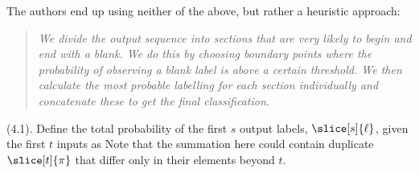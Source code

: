 \documentclass[11pt]{article}
\begin{document}
The authors end up using neither of the above, but rather a heuristic approach:
\vspace{-0.5em}
\begin{quote}
	{\footnotesize\itshape
		We divide the output sequence into sections that are very likely to begin and end with a blank. We do this by choosing boundary points where the probability of observing a blank label is above a certain threshold. We then calculate the most probable labelling for each section individually and concatenate these to get the final classification.}
\end{quote}

\myspace
\p {} (4.1). Define the total probability of the first $s$ output labels, $\slice[s]{\ell}$, given the first $t$ inputs as 
Note that the summation here could contain duplicate $\slice[t]{\pi}$ that differ only in their elements beyond $t$. \\
\end{document}

